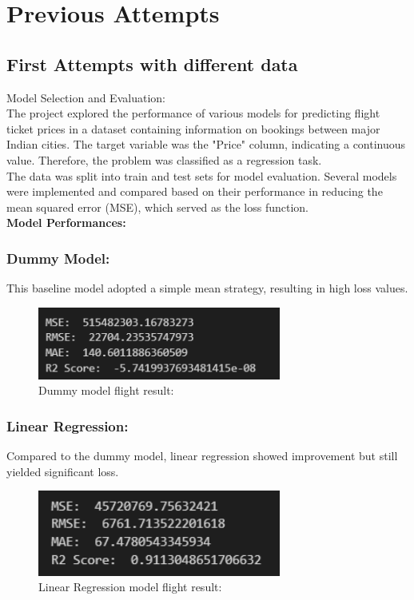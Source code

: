 \documentclass{article}
\begin{document}
\newpage
\section{Previous Attempts}
\subsection{First Attempts with different data}
Model Selection and Evaluation:\\
The project explored the performance of various models for predicting flight ticket prices in a dataset containing information on bookings between major Indian cities. The target variable was the "Price" column, indicating a continuous value. Therefore, the problem was classified as a regression task.\\
The data was split into train and test sets for model evaluation. Several models were implemented and compared based on their performance in reducing the mean squared error (MSE), which served as the loss function.\\\newline
\textbf{Model Performances:}\\

\subsubsection{Dummy Model:}
This baseline model adopted a simple mean strategy, resulting in high loss values.
\begin{figure}[H]
    \caption{Dummy model flight result:}
    \centering
    \includegraphics[width=8cm]{imgFolder/dummyModelFlight.png}
\end{figure}

\subsubsection{Linear Regression: }Compared to the dummy model, linear regression showed improvement but still yielded significant loss.
\begin{figure}[H]
    \caption{Linear Regression model flight result:}
    \centering
    \includegraphics[width=8cm]{imgFolder/linearRegressionFlight.png}
\end{figure}
\end{document}
